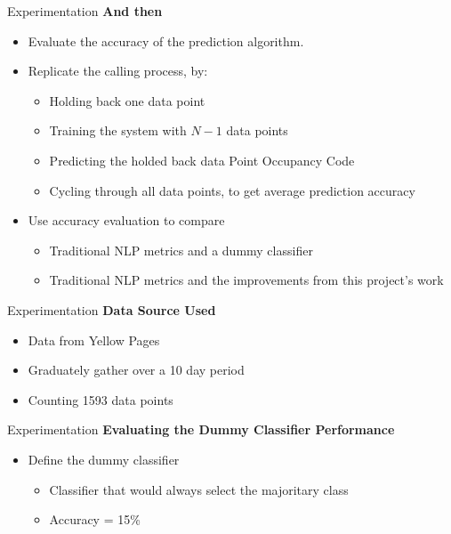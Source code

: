 
\begin{frame}[label=exp]{Experimentation}
	\textbf{And then}
	
	\begin{itemize}
	\item Evaluate the accuracy of the prediction algorithm.
	\item Replicate the calling process, by:
		\begin{itemize}
			\item Holding back one data point
			\item Training the system with $N-1$ data points
			\item Predicting the holded back data Point Occupancy Code
			\item Cycling through all data points, to get average prediction accuracy
		\end{itemize}
	\item Use accuracy evaluation to compare
		\begin{itemize}
			\item Traditional NLP metrics and a dummy classifier 
			\item Traditional NLP metrics and the improvements from this project's work
		\end{itemize}
	\end{itemize}
	
\end{frame}

\begin{frame}[label=exp]{Experimentation}
	\textbf{Data Source Used}
	
	\begin{itemize}
		\item Data from Yellow Pages
		\item Graduately gather over a 10 day period
		\item Counting 1593 data points
	\end{itemize}
	
\end{frame}



\begin{frame}[label=exp]{Experimentation}
	\textbf{Evaluating the Dummy Classifier Performance}
	
	\begin{itemize}
		\item Define the dummy classifier 
		\begin{itemize}
			\item Classifier that would always select the majoritary class
			\item Accuracy = 15\%
		\end{itemize}
		
	\end{itemize}
	
\end{frame}

